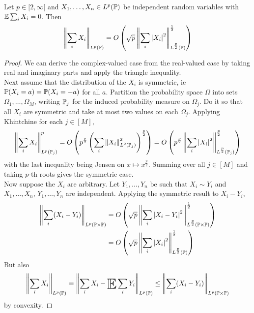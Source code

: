 \documentclass{article}
\begin{document}
\begin{thm}
  Let $p \in [2, \infty[$ and $X_1, \dots, X_n \in L^p(\P)$ be independent random variables with $\E \sum_i X_i = 0$. Then
  $$\norm{\sum_i X_i}_{L^p(\P)} = O\left(\sqrt p \norm{\sum_i \abs{X_i}^2}_{L^{\frac p2}(\P)}^{\frac 12}\right)$$
\end{thm}
\begin{proof}
  We can derive the complex-valued case from the real-valued case by taking real and imaginary parts and apply the triangle inequality. \\
  Next assume that the distribution of the $X_i$ is symmetric, ie $\P(X_i = a) = \P(X_i = -a)$ for all $a$. Partition the probability space $\Omega$ into sets $\Omega_1, \dots, \Omega_M$, writing $\P_j$ for the induced probability measure on $\Omega_j$. Do it so that all $X_i$ are symmetric and take at most two values on each $\Omega_j$. Applying Khintchine for each $j \in [M]$,
  $$\norm{\sum_i X_i}_{L^p(\P_j)}^p = O\left(p^{\frac p2} \left(\sum_i \norm{X_i}_{L^2(\P_j)}^2\right)^{\frac p2}\right) = O\left(p^{\frac p2} \norm{\sum_i \abs{X_i}^2}_{L^{\frac p2}(\P_j)}^{\frac p2}\right)$$
  with the last inequality being Jensen on $x \mapsto x^{\frac p2}$. Summing over all $j \in [M]$ and taking $p$-th roots gives the symmetric case. \\
  Now suppose the $X_i$ are arbitrary. Let $Y_1, \dots, Y_n$ be such that $X_i \sim Y_i$ and $X_1, \dots, X_n$, $Y_1, \dots, Y_n$ are independent. Applying the symmetric result to $X_i - Y_i$,
  \begin{align*}
    \norm{\sum_i (X_i - Y_i)}_{L^p(\P \times \P)}
    & = O\left(\sqrt p \norm{\sum_i \abs{X_i - Y_i}^2}_{L^{\frac p2}(\P \times \P)}^{\frac 12}\right) \\
    & = O\left(\sqrt p \norm{\sum_i \abs{X_i}^2}_{L^{\frac p2}(\P)}^{\frac 12}\right)
  \end{align*}
  But also
  $$\norm{\sum_i X_i}_{L^p(\P)} = \norm{\sum_i X_i - \E \sum_i Y_i}_{L^p(\P)} \le \norm{\sum_i (X_i - Y_i)}_{L^p(\P \times \P)}$$
  by convexity.
\end{proof}
\end{document}
